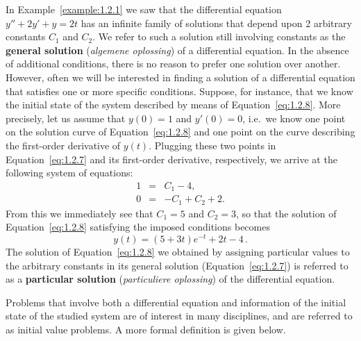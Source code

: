 In Example~\ref{example:1.2.1} we saw that the differential equation $y''+2y'+y=2t$ has an infinite family of solutions that depend upon
2 arbitrary constants $C_1$ and  $C_2$. We refer to such a solution still involving constants as the \textbf{general solution} (\textit{algemene oplossing}) of a differential equation. In the absence of additional conditions, there is no reason to prefer one solution over another. However, often we will be interested in finding a solution of a differential equation that satisfies one or more specific conditions. Suppose, for instance, that we know the initial state of the system described by means of Equation~\eqref{eq:1.2.8}. More precisely, let us assume that $y(0)=1$ and $y'(0)=0$, i.e.\ we know one point on the solution curve of Equation~\eqref{eq:1.2.8} and one point on the curve describing the first-order derivative of $y(t)$. Plugging these two points in Equation~\eqref{eq:1.2.7} and its first-order derivative, respectively, we arrive at the following system of equations:
$$
\begin{array}{rcl}
1&=&C_1-4,\\
0&=&-C_1+C_2+2.
\end{array}
$$
From this we immediately see that $C_1=5$ and $C_2=3$, so that the solution of Equation~\eqref{eq:1.2.8} satisfying the imposed conditions becomes
$$
y(t)=(5+3t)e^{-t}+2t-4\,.
$$
The solution of Equation~\eqref{eq:1.2.8} we obtained by assigning particular values to the arbitrary constants in its general solution (Equation~\eqref{eq:1.2.7}) is referred to as a \textbf{particular solution} (\textit{particuliere oplossing}) of the differential equation. 

Problems that involve both a differential equation and information of the initial state of the studied system are of interest in many disciplines, and are referred to as initial value problems. A more formal definition is given below. 


